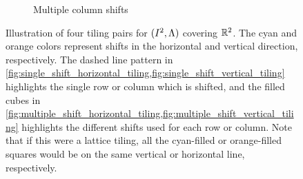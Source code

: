 \begin{figure}[t!]
\begin{subfigure}{.47\textwidth}
        \caption{Multiple column shifts}
        \label{fig:multiple_shift_vertical_tiling}
    \end{subfigure}
    \caption{Illustration of four tiling pairs for $(I^2,\Lambda)$ covering $\mathbb{R}^2$. The cyan and orange colors represent shifts in the horizontal and vertical direction, respectively. The dashed line pattern in \cref{fig:single_shift_horizontal_tiling,fig:single_shift_vertical_tiling} highlights the single row or column which is shifted, and the filled cubes in \cref{fig:multiple_shift_horizontal_tiling,fig:multiple_shift_vertical_tiling} highlights the different shifts used for each row or column. Note that if this were a lattice tiling, all the cyan-filled or orange-filled squares would be on the same vertical or horizontal line, respectively.}
    \label{fig:tiling_figures}
\end{figure}

